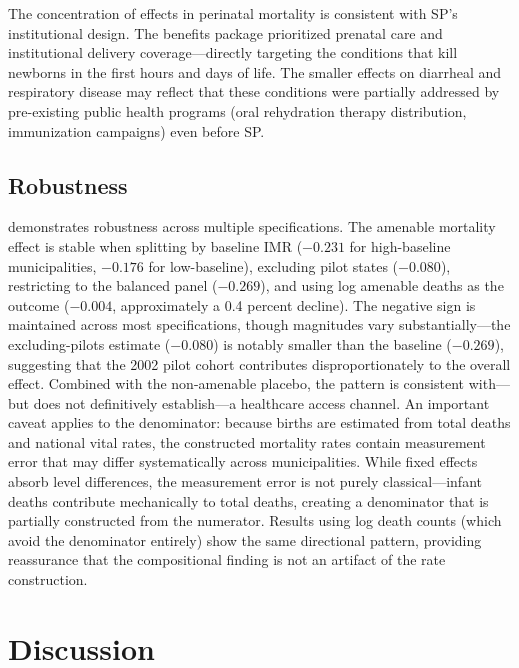 \documentclass[12pt]{article}
\begin{document}
The concentration of effects in perinatal mortality is consistent with SP's institutional design. The benefits package prioritized prenatal care and institutional delivery coverage---directly targeting the conditions that kill newborns in the first hours and days of life. The smaller effects on diarrheal and respiratory disease may reflect that these conditions were partially addressed by pre-existing public health programs (oral rehydration therapy distribution, immunization campaigns) even before SP.



\subsection{Robustness}

 demonstrates robustness across multiple specifications. The amenable mortality effect is stable when splitting by baseline IMR ($-0.231$ for high-baseline municipalities, $-0.176$ for low-baseline), excluding pilot states ($-0.080$), restricting to the balanced panel ($-0.269$), and using log amenable deaths as the outcome ($-0.004$, approximately a 0.4 percent decline). The negative sign is maintained across most specifications, though magnitudes vary substantially---the excluding-pilots estimate ($-0.080$) is notably smaller than the baseline ($-0.269$), suggesting that the 2002 pilot cohort contributes disproportionately to the overall effect. Combined with the non-amenable placebo, the pattern is consistent with---but does not definitively establish---a healthcare access channel. An important caveat applies to the denominator: because births are estimated from total deaths and national vital rates, the constructed mortality rates contain measurement error that may differ systematically across municipalities. While fixed effects absorb level differences, the measurement error is not purely classical---infant deaths contribute mechanically to total deaths, creating a denominator that is partially constructed from the numerator. Results using log death counts (which avoid the denominator entirely) show the same directional pattern, providing reassurance that the compositional finding is not an artifact of the rate construction.



\section{Discussion}
\end{document}
